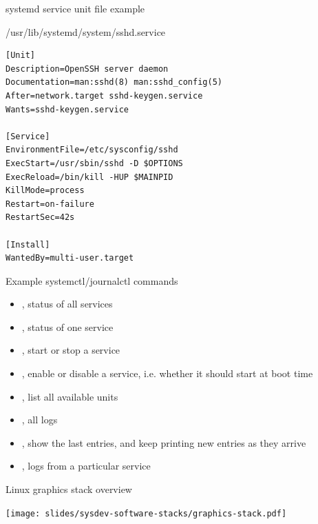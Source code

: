 \begin{frame}[fragile]{systemd service unit file example}
  \begin{block}{/usr/lib/systemd/system/sshd.service}
    {
      \scriptsize
\begin{verbatim}
[Unit]
Description=OpenSSH server daemon
Documentation=man:sshd(8) man:sshd_config(5)
After=network.target sshd-keygen.service
Wants=sshd-keygen.service

[Service]
EnvironmentFile=/etc/sysconfig/sshd
ExecStart=/usr/sbin/sshd -D $OPTIONS
ExecReload=/bin/kill -HUP $MAINPID
KillMode=process
Restart=on-failure
RestartSec=42s

[Install]
WantedBy=multi-user.target
\end{verbatim}
    }
  \end{block}
\end{frame}

\begin{frame}{Example systemctl/journalctl commands}
  \begin{itemize}
  \item {}, status of all services
  \item {}, status of one
    service
  \item {}, start or stop a service
  \item {}, enable
    or disable a service, i.e. whether it should start at boot time
  \item {}, list all available units
  \item {}, all logs
  \item {}, show the last entries, and keep printing
    new entries as they arrive
  \item {}, logs from a particular service
  \end{itemize}
\end{frame}

\begin{frame}{Linux graphics stack overview}
  \begin{center}
    \texttt{[image: slides/sysdev-software-stacks/graphics-stack.pdf]}
  \end{center}
\end{frame}

